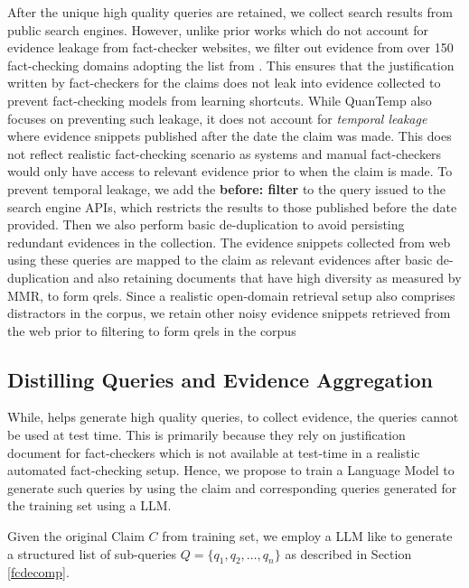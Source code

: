 After the unique high quality queries are retained, we collect search results from public search engines. However, unlike prior works \cite{multifc,schlichtkrull2023averitec,claimdecomp} which do not account for evidence leakage from fact-checker websites, we filter out evidence from over 150 fact-checking domains adopting the list from \cite{quantemp}. This ensures that the justification written by fact-checkers for the claims does not leak into evidence collected to prevent fact-checking models from learning shortcuts.  While QuanTemp \cite{quantemp} also focuses on preventing such leakage, it does not account for \textit{temporal leakage} where  evidence snippets published after the date the claim was made. This does not reflect realistic fact-checking scenario as systems and manual fact-checkers would only have access to relevant evidence prior to when the claim is made.  To prevent temporal leakage, we add the \textbf{before: filter} to the query issued to the search engine APIs, which restricts the results to those published before the date provided. Then we also perform basic de-duplication to avoid persisting redundant evidences in the collection. The evidence snippets collected from web using these queries are mapped to the claim as relevant evidences after basic de-duplication and also retaining documents that have high diversity as measured by MMR, to form qrels. Since a realistic open-domain retrieval setup also comprises distractors in the corpus, we retain other noisy evidence snippets retrieved from the web prior to filtering to form qrels in the corpus


\subsection{Distilling \name{} Queries and Evidence Aggregation}

While, \name{} helps generate high quality queries, to collect evidence, the queries cannot be used at test time. This is primarily because they rely on justification document for fact-checkers which is not available at test-time in a  realistic automated fact-checking setup. Hence, we propose to train a Language Model to generate such queries by using the claim and corresponding queries generated for the training set using a LLM.

Given the original Claim $C$ from training set, we employ a LLM like \gptt{} to generate a structured list of sub-queries 
$Q = \{q_1, q_2, \ldots, q_n\}$ as described in Section \ref{fcdecomp}.

